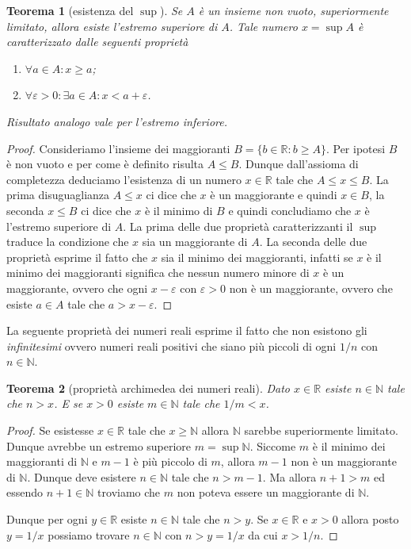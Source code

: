 \documentclass[italian,a4paper,oneside,headinclude]{scrbook}
\newcommand{\eps}{\varepsilon}
\newcommand{\NN}{\mathbb N}
\newcommand{\RR}{\mathbb R}
\newtheorem{theorem}{Teorema}
\begin{document}
\begin{theorem}[esistenza del $\sup$]
Se $A$ è un insieme non vuoto,
superiormente limitato, allora esiste l'estremo superiore di $A$.
Tale numero $x=\sup A$ è caratterizzato dalle seguenti proprietà
\begin{enumerate}
\item $\forall a\in A\colon x \ge a$;
\item $\forall \eps>0\colon \exists a\in A \colon x < a + \eps$.
\end{enumerate}

Risultato analogo vale per l'estremo inferiore.
\end{theorem}
%
\begin{proof}
Consideriamo l'insieme dei maggioranti
$B = \{ b\in \RR \colon b \ge A\}$.
Per ipotesi $B$ è non vuoto e per come è definito risulta $A\le B$.
Dunque dall'assioma di completezza deduciamo l'esistenza di un numero $x\in \RR$
tale che $A\le x \le B$. La prima disuguaglianza $A\le x$ ci dice che $x$ è un
maggiorante e quindi $x\in B$, la seconda $x\le B$ ci dice che $x$ è il minimo
di $B$ e quindi concludiamo che $x$ è l'estremo superiore di $A$.
La prima delle due proprietà caratterizzanti il $\sup$ traduce la condizione
che $x$ sia un maggiorante di $A$. La seconda delle due proprietà esprime il
fatto che $x$ sia il minimo dei maggioranti, infatti se $x$ è il minimo
dei maggioranti significa che nessun numero minore di $x$ è un maggiorante, ovvero
che ogni $x-\eps$ con $\eps>0$ non è un maggiorante, ovvero
che esiste $a\in A$ tale che $a > x-\eps$.
\end{proof}

La seguente proprietà dei numeri reali esprime il fatto
che non esistono gli \emph{infinitesimi} ovvero numeri reali positivi
che siano più piccoli di ogni $1/n$ con $n\in \NN$.

\begin{theorem}[proprietà archimedea dei numeri reali]
Dato $x\in \RR$ esiste $n\in \NN$ tale che $n > x$.
E se $x>0$ esiste $m\in \NN$ tale che $1/m < x$.
\end{theorem}
%
\begin{proof}
Se esistesse $x\in \RR$ tale che $x \ge \NN$
allora $\NN$ sarebbe superiormente limitato.
Dunque avrebbe un estremo superiore $m= \sup \NN$.
Siccome $m$ è il minimo dei maggioranti di $\NN$
e $m-1$ è più piccolo di $m$, allora $m-1$ non è un maggiorante
di $\NN$. Dunque deve esistere $n\in \NN$ tale che $n>m-1$.
Ma allora $n+1 > m$ ed essendo $n+1\in \NN$ troviamo che $m$
non poteva essere un maggiorante di $\NN$.

Dunque per ogni $y\in \RR$ esiste $n\in \NN$ tale che $n>y$.
Se $x\in \RR$ e $x>0$ allora posto $y=1/x$ possiamo trovare
$n\in \NN$ con $n>y = 1/x$ da cui $x > 1/n$.
\end{proof}
\end{document}
